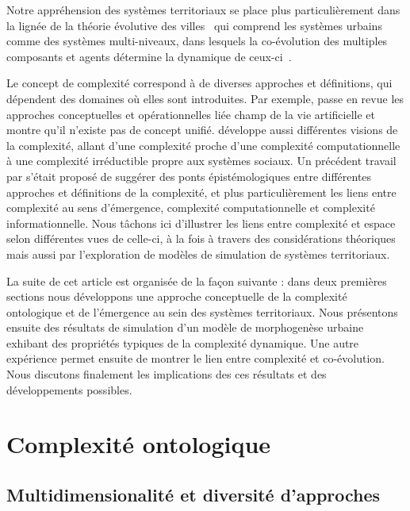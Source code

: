 \documentclass[11pt]{article}
\begin{document}
Notre appréhension des systèmes territoriaux se place plus particulièrement dans la lignée de la théorie évolutive des villes~\citep{pumain1997pour} qui comprend les systèmes urbains comme des systèmes multi-niveaux, dans lesquels la co-évolution des multiples composants et agents détermine la dynamique de ceux-ci~\citep{raimbault2018caracterisation}.

Le concept de complexité correspond à de diverses approches et définitions, qui dépendent des domaines où elles sont introduites. Par exemple, \cite{chu2008criteria} passe en revue les approches conceptuelles et opérationnelles liée champ de la vie artificielle et montre qu'il n'existe pas de concept unifié. \cite{deffuant2015visions} développe aussi différentes visions de la complexité, allant d'une complexité proche d'une complexité computationnelle à une complexité irréductible propre aux systèmes sociaux. Un précédent travail par \cite{raimbault2018relating} s'était proposé de suggérer des ponts épistémologiques entre différentes approches et définitions de la complexité, et plus particulièrement les liens entre complexité au sens d'émergence, complexité computationnelle et complexité informationnelle. Nous tâchons ici d'illustrer les liens entre complexité et espace selon différentes vues de celle-ci, à la fois à travers des considérations théoriques mais aussi par l'exploration de modèles de simulation de systèmes territoriaux.

La suite de cet article est organisée de la façon suivante : dans deux premières sections nous développons une approche conceptuelle de la complexité ontologique et de l'émergence au sein des systèmes territoriaux. Nous présentons ensuite des résultats de simulation d'un modèle de morphogenèse urbaine exhibant des propriétés typiques de la complexité dynamique. Une autre expérience permet ensuite de montrer le lien entre complexité et co-évolution. Nous discutons finalement les implications des ces résultats et des développements possibles.



\section{Complexité ontologique}


\subsection{Multidimensionalité et diversité d'approches}
\end{document}

